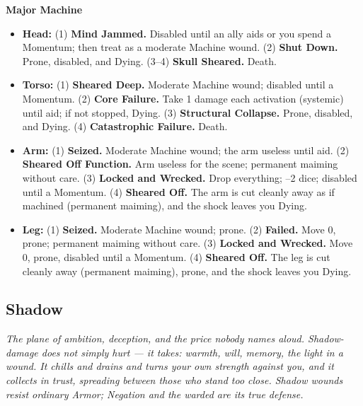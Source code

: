 \textbf{Major Machine}
\begin{itemize}
    \item \textbf{Head:} (1) \textbf{Mind Jammed.} Disabled until an ally aids or you spend a Momentum; then treat as a moderate Machine wound. (2) \textbf{Shut Down.} Prone, disabled, and Dying. (3--4) \textbf{Skull Sheared.} Death.
    \item \textbf{Torso:} (1) \textbf{Sheared Deep.} Moderate Machine wound; disabled until a Momentum. (2) \textbf{Core Failure.} Take 1 damage each activation (systemic) until aid; if not stopped, Dying. (3) \textbf{Structural Collapse.} Prone, disabled, and Dying. (4) \textbf{Catastrophic Failure.} Death.
    \item \textbf{Arm:} (1) \textbf{Seized.} Moderate Machine wound; the arm useless until aid. (2) \textbf{Sheared Off Function.} Arm useless for the scene; permanent maiming without care. (3) \textbf{Locked and Wrecked.} Drop everything; --2 dice; disabled until a Momentum. (4) \textbf{Sheared Off.} The arm is cut cleanly away as if machined (permanent maiming), and the shock leaves you Dying.
    \item \textbf{Leg:} (1) \textbf{Seized.} Moderate Machine wound; prone. (2) \textbf{Failed.} Move 0, prone; permanent maiming without care. (3) \textbf{Locked and Wrecked.} Move 0, prone, disabled until a Momentum. (4) \textbf{Sheared Off.} The leg is cut cleanly away (permanent maiming), prone, and the shock leaves you Dying.
\end{itemize}

\subsection{Shadow}

\textit{The plane of ambition, deception, and the price nobody names aloud. Shadow-damage does not simply hurt --- it takes: warmth, will, memory, the light in a wound. It chills and drains and turns your own strength against you, and it collects in trust, spreading between those who stand too close. Shadow wounds resist ordinary Armor; Negation and the warded are its true defense.}


